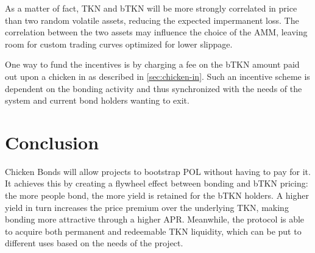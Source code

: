 \documentclass{article}
\begin{document}
As a matter of fact, TKN and bTKN will be more strongly correlated in price than two random volatile assets, reducing the expected impermanent loss. The correlation between the two assets may influence the choice of the AMM, leaving room for custom trading curves optimized for lower slippage.

One way to fund the incentives is by charging a fee on the bTKN amount paid out upon a chicken in as described in \ref{sec:chicken-in}. 
Such an incentive scheme is dependent on the bonding activity and thus synchronized with the needs of the system and current bond holders wanting to exit.

\section{Conclusion}
Chicken Bonds will allow projects to bootstrap POL without having to pay for it. It achieves this by creating a flywheel effect between bonding and bTKN pricing: the more people bond, the more yield is retained for the bTKN holders. A higher yield in turn increases the price premium over the underlying TKN, making bonding more attractive through a higher APR. Meanwhile, the protocol is able to acquire both permanent and redeemable TKN liquidity, which can be put to different uses based on the needs of the project.
\end{document}
